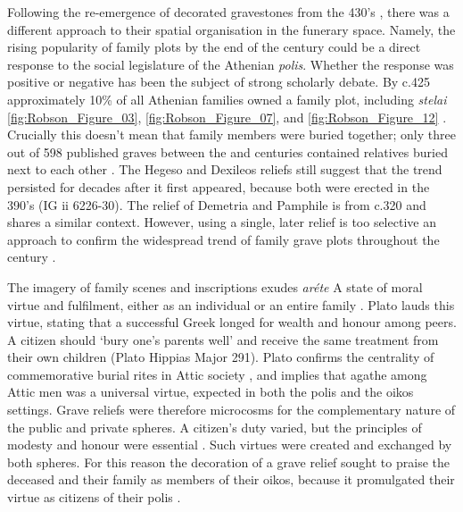 Following the re-emergence of decorated gravestones from the 430’s \BC, there was a different approach to their spatial organisation in the funerary space. Namely, the rising popularity of family plots by the end of the  century could be a direct response to the social legislature of the Athenian \textit{polis}. Whether the response was positive or negative has been the subject of strong scholarly debate. By c.425 \BC approximately 10\% of all Athenian families owned a family plot, including \textit{stelai} \ref{fig:Robson_Figure_03}, \ref{fig:Robson_Figure_07}, and \ref{fig:Robson_Figure_12} \parencite[41]{Stears2000b}.
Crucially this doesn’t mean that family members were buried together; only three out of 598 published graves between the  and  centuries \BC contained relatives buried next to each other \parencite[124]{Pomeroy1997}.
The Hegeso and Dexileos reliefs still suggest that the trend persisted for decades after it first appeared, because both were erected in the 390’s \BC (IG ii 6226-30).
The relief of Demetria and Pamphile is from c.320 \BC and shares a similar context. However, using a single, later relief is too selective an approach to confirm the widespread trend of family grave plots throughout the  century \BC.

The imagery of family scenes and inscriptions exudes \textit{aréte} A state of moral virtue and fulfilment, either as an individual or an entire family \parencite[117]{Sourvinouinwood1995b}.
Plato lauds this virtue, stating that a successful Greek longed for wealth and honour among peers. A citizen should \enquote*{bury one’s parents well} and receive the same treatment from their own children (Plato Hippias Major 291).
Plato confirms the centrality of commemorative burial rites in Attic society \parencite[22]{Garland2001}, and implies that agathe among Attic men was a universal virtue, expected in both the polis and the oikos settings. Grave reliefs were therefore microcosms for the complementary nature of the public and private spheres.
A citizen’s duty varied, but the principles of modesty and honour were essential \parencite[32]{Burton2003}.
Such virtues were created and exchanged by both spheres. For this reason the decoration of a grave relief sought to praise the deceased and their family as members of their oikos, because it promulgated their virtue as citizens of their polis \parencite[41]{Strauss1993}.

